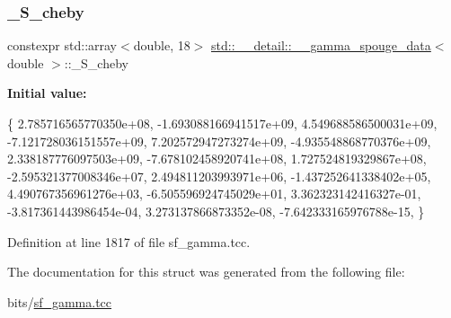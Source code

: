 \subsubsection{\texorpdfstring{\+\_\+\+S\+\_\+cheby}{\_S\_cheby}}
{\footnotesize\ttfamily constexpr std\+::array$<$double, 18$>$ \hyperlink{structstd_1_1____detail_1_1____gamma__spouge__data}{std\+::\+\_\+\+\_\+detail\+::\+\_\+\+\_\+gamma\+\_\+spouge\+\_\+data}$<$ double $>$\+::\+\_\+\+S\+\_\+cheby\hspace{0.3cm}{\ttfamily [static]}}

{\bfseries Initial value\+:}
\begin{DoxyCode}
\{
     2.785716565770350e+08,
    -1.693088166941517e+09,
     4.549688586500031e+09,
    -7.121728036151557e+09,
     7.202572947273274e+09,
    -4.935548868770376e+09,
     2.338187776097503e+09,
    -7.678102458920741e+08,
     1.727524819329867e+08,
    -2.595321377008346e+07,
     2.494811203993971e+06,
    -1.437252641338402e+05,
     4.490767356961276e+03,
    -6.505596924745029e+01,
     3.362323142416327e-01,
    -3.817361443986454e-04,
     3.273137866873352e-08,
    -7.642333165976788e-15,
      \}
\end{DoxyCode}


Definition at line 1817 of file sf\+\_\+gamma.\+tcc.



The documentation for this struct was generated from the following file\+:\begin{DoxyCompactItemize}
\item 
bits/\hyperlink{sf__gamma_8tcc}{sf\+\_\+gamma.\+tcc}\end{DoxyCompactItemize}

